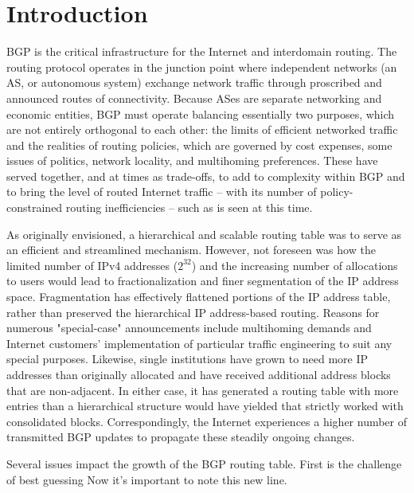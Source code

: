 \section{Introduction}

BGP is the critical infrastructure for the Internet and interdomain routing.  The routing protocol operates in the junction point where independent networks (an AS, or autonomous system) exchange network traffic through proscribed and announced routes of connectivity.  Because ASes are separate networking and economic entities, BGP must operate balancing essentially two purposes, which are not entirely orthogonal to each other: the limits of efficient networked traffic and the realities of routing policies, which are governed by cost expenses, some issues of politics, network locality, and multihoming preferences.  These have served together, and at times as trade-offs, to add to complexity within BGP and to bring the level of routed Internet traffic -- with its number of policy-constrained routing inefficiencies -- such as is seen at this time.

As originally envisioned, a hierarchical and scalable routing table was to serve as an efficient and streamlined mechanism.  However, not foreseen was how the limited number of IPv4 addresses ($2^{32}$) and the increasing number of allocations to users would lead to fractionalization and finer segmentation of the IP address space.  Fragmentation has effectively flattened portions of the IP address table, rather than preserved the hierarchical IP address-based routing.  Reasons for numerous "special-case" announcements include multihoming demands and Internet customers' implementation of particular traffic engineering to suit any special purposes.  Likewise, single institutions have grown to need more IP addresses than originally allocated and have received additional address blocks that are non-adjacent.  In either case, it has generated a routing table with more entries than a hierarchical structure would have yielded that strictly worked with consolidated blocks.  Correspondingly, the Internet experiences a higher number of transmitted BGP updates to propagate these steadily ongoing changes.

Several issues impact the growth of the BGP routing table.  First is the challenge of best guessing
Now it's important to note this new line.


